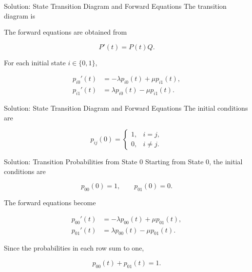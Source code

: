 \documentclass[
  ignorenonframetext,
  aspectratio=169,
]{beamer}
\begin{document}
\begin{frame}{Solution: State Transition Diagram and Forward Equations}
\protect{}\label{solution-state-transition-diagram-and-forward-equations}
The transition diagram is

\begin{center}
\end{center}

The forward equations are obtained from

\[
P'(t)=P(t)Q.
\]

For each initial state \(i\in\{0,1\}\),

\[
\begin{aligned}
p_{i0}'(t)
&=-\lambda p_{i0}(t)+\mu p_{i1}(t),\\
p_{i1}'(t)
&=\lambda p_{i0}(t)-\mu p_{i1}(t).
\end{aligned}
\]
\end{frame}

\begin{frame}{Solution: State Transition Diagram and Forward Equations}
\protect{}\label{solution-state-transition-diagram-and-forward-equations-1}
The initial conditions are

\[
p_{ij}(0)=
\begin{cases}
1, & i=j,\\
0, & i\neq j.
\end{cases}
\]
\end{frame}

\begin{frame}{Solution: Transition Probabilities from State 0}
\protect{}\label{solution-transition-probabilities-from-state-0}
Starting from State 0, the initial conditions are

\[
p_{00}(0)=1,
\qquad
p_{01}(0)=0.
\]

The forward equations become

\[
\begin{aligned}
p_{00}'(t)
&=-\lambda p_{00}(t)+\mu p_{01}(t),\\
p_{01}'(t)
&=\lambda p_{00}(t)-\mu p_{01}(t).
\end{aligned}
\]

Since the probabilities in each row sum to one,

\[
p_{00}(t)+p_{01}(t)=1.
\]
\end{frame}
\end{document}
